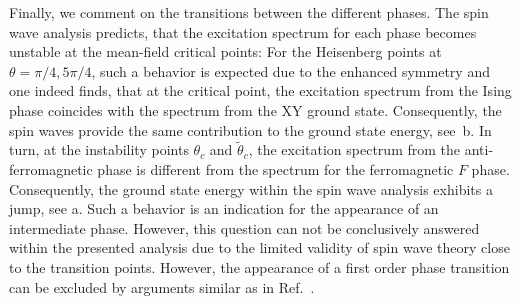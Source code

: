 Finally, we comment on the transitions between the different phases. The spin wave analysis predicts,
that the excitation spectrum for each phase becomes unstable at the mean-field critical points: For the Heisenberg
points at $\theta = \pi/4, 5\pi/4$, such a behavior is expected due to the enhanced symmetry and one indeed finds,
that at the critical point, the excitation spectrum from the Ising phase coincides with the spectrum from the XY ground state.
Consequently, the spin waves provide the same contribution to the ground state energy, see~b. In turn, at the instability points
$\theta_{c}$ and $\tilde{\theta}_{c}$, the excitation spectrum from the anti-ferromagnetic phase is different from the spectrum for the ferromagnetic $F$ phase.
Consequently, the ground state energy within the spin wave analysis exhibits a jump, see a. Such a behavior is an indication
for the appearance of an intermediate phase. However, this question can not be conclusively answered within the presented analysis due to the limited validity of spin wave theory close to the transition points. However, the appearance of a first order phase transition can be excluded by arguments similar as in
Ref.~\cite{Spivak2004}.

